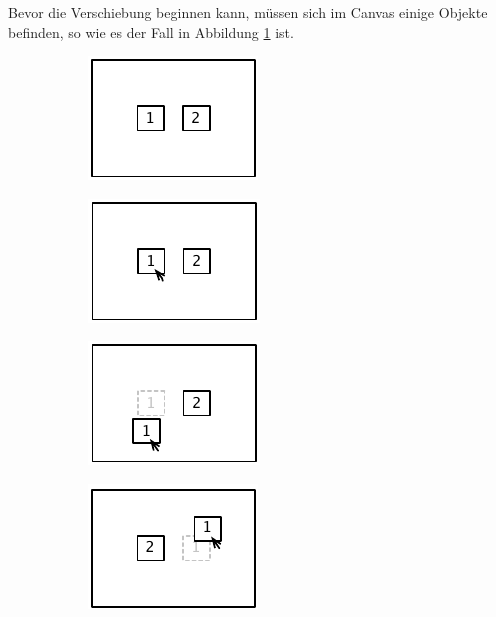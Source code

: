 Bevor die Verschiebung beginnen kann, müssen sich im Canvas einige Objekte befinden, so wie es der Fall in Abbildung \ref{fig:movement-action-example-a} ist.

\begin{figure}[hbt]
    \newcommand{\subfigurewidth}{0.28\textwidth}
    \newcommand{\graphicsscale}{1.2}
    \centering
    \begin{subfigure}{\subfigurewidth}
        \centering
        \includegraphics[scale=\graphicsscale]{resources/movement-action-example-a}
        \caption{}
        \label{fig:movement-action-example-a}
    \end{subfigure}
    \begin{subfigure}{\subfigurewidth}
        \centering
        \includegraphics[scale=\graphicsscale]{resources/movement-action-example-b}
        \caption{}
        \label{fig:movement-action-example-b}
    \end{subfigure}
    \begin{subfigure}{\subfigurewidth}
        \centering
        \includegraphics[scale=\graphicsscale]{resources/movement-action-example-c}
        \caption{}
        \label{fig:movement-action-example-c}
    \end{subfigure}
    \begin{subfigure}{\subfigurewidth}
        \centering
        \includegraphics[scale=\graphicsscale]{resources/movement-action-example-d}

\end{subfigure}
\end{figure}
